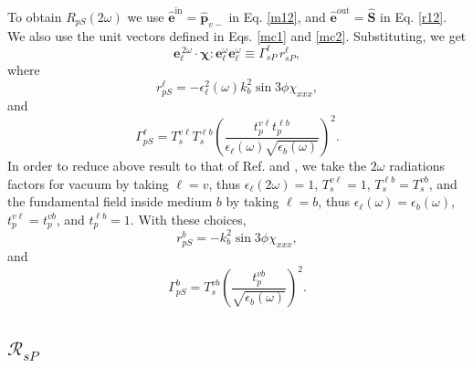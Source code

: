 \documentclass[10pt]{article}
\begin{document}
To obtain $R_{pS}(2\omega)$ we use
$\hat{\mathbf{e}}^{\mathrm{in}}=\hat{\mathbf{p}}_{v-}$ in Eq. \eqref{m12}, and
$\hat{\mathbf{e}}^{\mathrm{out}}=\hat{\mathbf{S}}$ in Eq. \eqref{r12}. We also
use the unit vectors defined in Eqs. \eqref{mc1} and
\eqref{mc2}. Substituting, we get
\begin{equation*}
\mathbf{e}^{\,2\omega}_{\ell}\cdot
\boldsymbol{\chi}:\mathbf{e}^\omega_{\ell}\mathbf{e}^\omega_{\ell}
\equiv\Gamma^{\ell}_{sP}\, r^{\ell}_{sP},
\end{equation*}
where
\begin{equation}
r^{\ell}_{pS}
= -\epsilon^{2}_{\ell}(\omega)k^{2}_{b}\sin3\phi\chi_{xxx},
\end{equation} 
and  
\begin{equation}
\Gamma^{\ell}_{pS} =
T^{v\ell}_{s}T^{\ell b}_{s}\left(\frac{t^{v\ell}_{p}t^{\ell b}_{p}}
      {\epsilon_{\ell}(\omega)\sqrt{\epsilon_{b}(\omega)}}\right)^{2}.
\end{equation} 
In order to reduce above result to that of Ref. \cite{mizrahiJOSA88} and
\cite{sipePRB87},  we take the $2\omega$ radiations factors for vacuum by
taking $\ell=v$, thus $\epsilon_{\ell}(2\omega)=1$, $T^{v\ell}_{s}=1$,
$T^{\ell b}_{s}=T^{vb}_{s}$, and the fundamental field inside medium $b$ by
taking $\ell=b$, thus $\epsilon_{\ell}(\omega)=\epsilon_{b}(\omega)$,
$t^{v\ell}_{p}=t^{vb}_{p}$, and $t^{\ell b}_{p}=1$. With these choices,
\begin{equation*}
r^{b}_{pS} = -k^{2}_{b}\sin3\phi\chi_{xxx},
\end{equation*} 
and 
\begin{equation*}
\Gamma^{b}_{pS} =
T^{vb}_{s}
\left(
\frac{t^{vb}_{p}}{\sqrt{\epsilon_{b}(\omega)}}
\right)^{2}.  
\end{equation*} 


\subsection{\texorpdfstring{$\mathcal{R}_{sP}$}{RsP}}
\end{document}
